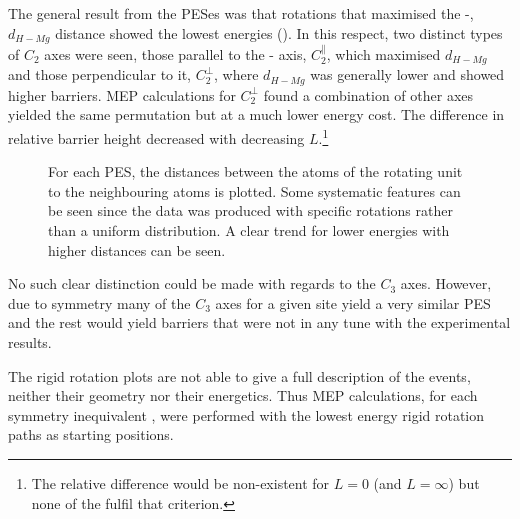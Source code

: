 The general result from the PESes was that rotations that maximised the -, $d_{H-Mg}$ distance showed the lowest energies ().
In this respect, two distinct types of $C_2$ axes were seen, those parallel to the - axis, $C_2^\parallel$, which maximised $d_{H-Mg}$ and those perpendicular to it, $C_2^\perp$, where $d_{H-Mg}$ was generally lower and showed higher barriers.
MEP calculations for $C_2^\perp$ found a combination of other axes yielded the same permutation but at a much lower energy cost.
The difference in relative barrier height decreased with decreasing $L$.\footnote{The relative difference would be non-existent for $L=0$ (and $L=\infty$) but none of the  fulfil that criterion.}

\begin{figure}[htb]
\begin{center}
    \parbox{0.85\linewidth}{
      \caption{For each PES, the distances between the  atoms of the rotating  unit to the neighbouring  atoms is plotted.
Some systematic features can be seen since the data was produced with specific rotations rather than a uniform distribution.
A clear trend for lower energies with higher distances can be seen.
      }
      \label{fig:h-mg-distances}
    }
\end{center}
\end{figure}

No such clear distinction could be made with regards to the $C_3$ axes.
However, due to symmetry many of the $C_3$ axes for a given site yield a very similar PES and the rest would yield barriers that were not in any tune with the experimental results.

The rigid rotation plots are not able to give a full description of the events, neither their geometry nor their energetics.
Thus MEP calculations, for each symmetry inequivalent , were performed with the lowest energy rigid rotation paths as starting positions.

